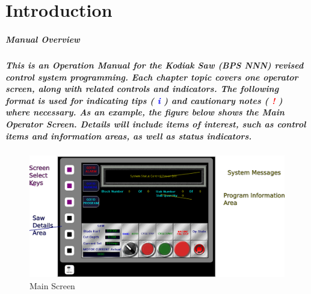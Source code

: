 \chapter{Introduction}
\paragraph{Manual Overview}
\paragraph*{
This is an Operation Manual for the Kodiak Saw (BPS NNN) revised control system programming. Each chapter topic covers one operator screen, along with related controls and indicators. The following format is used for indicating tips \textbf{\LARGE ( \textcolor{blue}{i} )} and cautionary notes \textbf{{\LARGE ( \textcolor{red}{!} )}} where necessary. As an example, the figure below shows the Main Operator Screen. Details will include items of interest, such as control items and information areas, as well as status indicators.
}
\begin{figure}
		\centering
		\includegraphics[width=0.7\linewidth]{screen-captures/main-screen}
		\caption{Main Screen}
		\label{fig:main-screen}
\end{figure}


